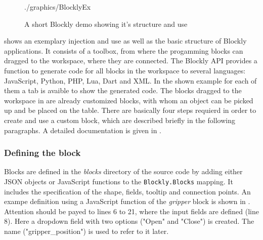 \begin{figure}[htbp]
	\centering
	\begin{overpic}[width=0.9\linewidth]{./graphics/BlocklyEx}
	\end{overpic}
	\caption{A short Blockly demo showing it's structure and use}%
	\label{fig:BlocklyEx}%
\end{figure}

 shows an exemplary injection and use as well as the basic structure of Blockly applications. It consists of a toolbox, from where the progamming blocks can dragged to the workspace, where they are connected. The Blockly API \cite{BlocklyAPI} provides a function to generate code for all blocks in the workspace to several languages: JavaScript, Python, PHP, Lua, Dart and XML. In the shown example for each of them a tab is avaible to show the generated code. The blocks dragged to the workspace in  are already customized blocks, with whom an object can be picked up and be placed on the table. There are basically four steps requierd in order to create and use a custom block, which are described briefly in the following paragraphs. A detailed documentation is given in \cite{BlocklyCustomBlocks}.

\subsubsection{Defining the block}
Blocks are defined in the \textit{blocks} directory of the source code by adding either JSON objects or JavaScript functions to the \lstinline!Blockly.Blocks! mapping. It includes the specification of the shape, fields, tooltip and connection points. An exampe definition using a JavaScript function of the \textit{gripper} block is shown in . Attention should be payed to lines 6 to 21, where the input fields are defined (line 8). Here a dropdown field with two options ("Open" and "Close") is created. The name ("gripper\_position") is used to refer to it later.

\begin{figure}[htbp]
	
\end{figure}

